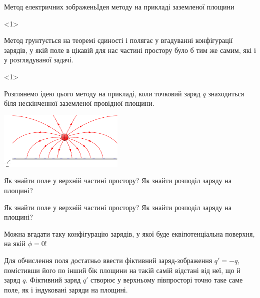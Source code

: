 \documentclass[onlytextwidth]{beamer}
\begin{document}
\begin{frame}{Метод електричних зображень}{Ідея методу на прикладі заземленої площини}
	\begin{onlyenv}
		\begin{block}{}\justifying
			Метод \alert{грунтується на теоремі єдиності} і \alert{полягає у вгадуванні
				конфігурації зарядів}, у якій поле в цікавій для нас частині простору було б тим же
			самим, які і у розглядуваної задачі.
		\end{block}
	\end{onlyenv}
	\begin{onlyenv}
		\begin{block}{}\justifying\small
			Розглянемо ідею цього методу на прикладі, коли точковий заряд $q$
			знаходиться	біля нескінченної заземленої провідної площини.
		\end{block}
		\begin{center}
			\includegraphics[width=6cm]{charge_near_plane.pdf}
		\end{center}
		\begin{alertblock}{}
			Як знайти поле у верхній частині простору? Як знайти розподіл заряду на площині?
		\end{alertblock}
	\end{onlyenv}
	\begin{overprint}
		\begin{alertblock}{}
			Як знайти поле у верхній частині простору? Як знайти розподіл заряду на площині?
		\end{alertblock}
		\begin{alertblock}{}
			Можна вгадати таку конфігурацію зарядів, у якої буде еквіпотенціальна поверхня, на якій
			$\phi = 0$!
		\end{alertblock}
		\begin{block}{}\justifying
			Для обчислення поля достатньо ввести \alert{фіктивний заряд-зображення $q' = -q$},
			помістивши його по інший бік площини на такій самій відстані від неї, що й заряд $q$.
			Фіктивний заряд $q'$ створює у верхньому півпросторі точно таке саме поле, як і індуковані
			заряди на площині.
		\end{block}
	\end{overprint}


\end{frame}
\end{document}
